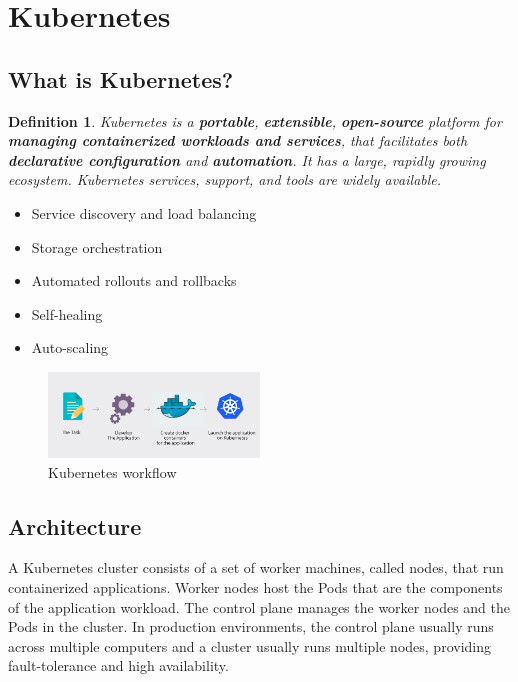 \documentclass{article}
\newtheorem{theorem}{Definition}[section]
\begin{document}
\section{Kubernetes}

\subsection{What is Kubernetes?}

\begin{theorem}
    Kubernetes is a \textbf{portable}, \textbf{extensible}, \textbf{open-source} platform for \textbf{managing 
    containerized workloads and services}, that facilitates both \textbf{declarative configuration} and \textbf{automation}. 
    It has a large, rapidly growing ecosystem. Kubernetes services, support, and tools are widely available.
\end{theorem}

\begin{itemize}
    \item Service discovery and load balancing
    \item Storage orchestration
    \item Automated rollouts and rollbacks
    \item Self-healing
    \item Auto-scaling
\end{itemize}

\begin{figure}[H]
    \centering
    \includegraphics[width=0.5\textwidth]{img/kubernetes-workflow.jpg}
    \caption{Kubernetes workflow}
\end{figure}

\subsection{Architecture}

A Kubernetes cluster consists of a set of worker machines, called nodes, that run containerized applications. 
Worker nodes host the Pods that are the components of the application workload. 
The control plane manages the worker nodes and the Pods in the cluster. 
In production environments, the control plane usually runs across multiple computers and a cluster usually runs multiple nodes, 
providing fault-tolerance and high availability.
\end{document}
